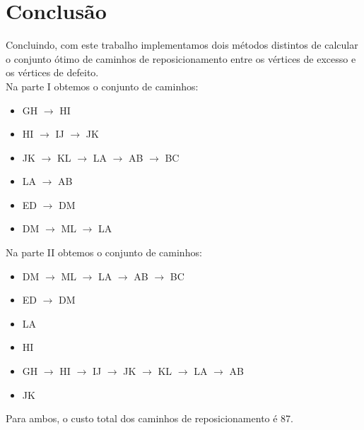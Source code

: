 \documentclass[a4paper]{report}
\begin{document}
\chapter{Conclusão}
Concluindo, com este trabalho implementamos dois métodos distintos de calcular
o conjunto ótimo de caminhos de reposicionamento entre os vértices de excesso e
os vértices de defeito.\\
Na parte I obtemos o conjunto de caminhos:
\begin{itemize}
        \item GH $\rightarrow$ HI
        \item HI $\rightarrow$ IJ $\rightarrow$ JK
        \item JK $\rightarrow$ KL $\rightarrow$ LA $\rightarrow$ AB $\rightarrow$ BC
        \item LA $\rightarrow$ AB
        \item ED $\rightarrow$ DM
        \item DM $\rightarrow$ ML $\rightarrow$ LA
\end{itemize}
Na parte II obtemos o conjunto de caminhos:
\begin{itemize}
        \item DM $\rightarrow$ ML $\rightarrow$ LA $\rightarrow$ AB $\rightarrow$ BC
        \item ED $\rightarrow$ DM 
        \item LA
        \item HI
        \item GH $\rightarrow$ HI $\rightarrow$ IJ $\rightarrow$ JK $\rightarrow$ KL $\rightarrow$ LA $\rightarrow$ AB
        \item JK
\end{itemize}
Para ambos, o custo total dos caminhos de reposicionamento é 87.
\end{document}
